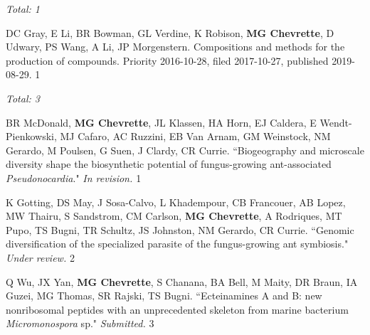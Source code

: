 \begin{cvpubs}

\cvpub
{\hspace{-1cm} \textit{Total: 1}} %
{}

\cvpub
{DC Gray, E Li, BR Bowman, GL Verdine, K Robison, \textbf{MG Chevrette}, D Udwary, PS Wang, A Li, JP Morgenstern. Compositions and methods for the production of compounds. Priority 2016-10-28, filed 2017-10-27, published 2019-08-29. \textbf{\textit{}}}
{1}

\end{cvpubs}


 \vspace{-2mm}

\begin{cvpubs}

\cvpub
{\hspace{-1cm} \textit{Total: 3}} %
{}

\cvpub
{BR McDonald, \textbf{MG Chevrette}, JL Klassen, HA Horn, EJ Caldera, E Wendt-Pienkowski, MJ Cafaro, AC Ruzzini, EB Van Arnam, GM Weinstock, NM Gerardo, M Poulsen, G Suen, J Clardy, CR Currie. ``Biogeography and microscale diversity shape the biosynthetic potential of fungus-growing ant-associated \textit{Pseudonocardia}." \textit{In revision. \textbf{}}}
{1}

\cvpub
{K Gotting, DS May, J Sosa-Calvo, L Khadempour, CB Francouer, AB Lopez, MW Thairu, S Sandstrom, CM Carlson, \textbf{MG Chevrette}, A Rodriques, MT Pupo, TS Bugni, TR Schultz, JS Johnston, NM Gerardo, CR Currie. ``Genomic diversification of the specialized parasite of the fungus-growing ant symbiosis." \textit{Under review.}}
{2}

\cvpub
{Q Wu, JX Yan, \textbf{MG Chevrette}, S Chanana, BA Bell, M Maity, DR Braun, IA Guzei, MG Thomas, SR Rajski, TS Bugni. ``Ecteinamines A and B: new nonribosomal peptides with an unprecedented skeleton from marine bacterium \textit{Micromonospora} sp." \textit{Submitted.}}
{3}

\end{cvpubs}